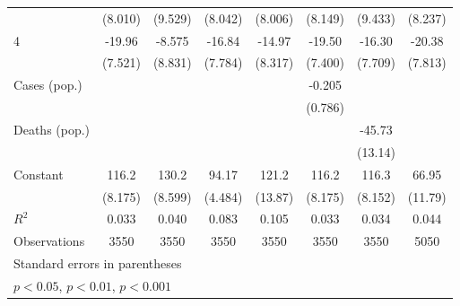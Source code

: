 \documentclass{article}
\begin{document}
{\begin{longtable}{l*{7}{c}}
                &  (8.010)         &  (9.529)         &  (8.042)         &  (8.006)         &  (8.149)         &  (9.433)         &  (8.237)         \\
4               &   -19.96\sym{*}  &   -8.575         &   -16.84\sym{*}  &   -14.97         &   -19.50\sym{*}  &   -16.30\sym{*}  &   -20.38\sym{*}  \\
                &  (7.521)         &  (8.831)         &  (7.784)         &  (8.317)         &  (7.400)         &  (7.709)         &  (7.813)         \\
Cases (pop.)    &                  &                  &                  &                  &   -0.205         &                  &                  \\
                &                  &                  &                  &                  &  (0.786)         &                  &                  \\
Deaths (pop.)   &                  &                  &                  &                  &                  &   -45.73\sym{**} &                  \\
                &                  &                  &                  &                  &                  &  (13.14)         &                  \\
Constant        &    116.2\sym{***}&    130.2\sym{***}&    94.17\sym{***}&    121.2\sym{***}&    116.2\sym{***}&    116.3\sym{***}&    66.95\sym{***}\\
                &  (8.175)         &  (8.599)         &  (4.484)         &  (13.87)         &  (8.175)         &  (8.152)         &  (11.79)         \\
\hline
\(R^{2}\)       &    0.033         &    0.040         &    0.083         &    0.105         &    0.033         &    0.034         &    0.044         \\
Observations    &     3550         &     3550         &     3550         &     3550         &     3550         &     3550         &     5050         \\
\hline\hline
\multicolumn{8}{l}{\footnotesize Standard errors in parentheses}\\
\multicolumn{8}{l}{\footnotesize \sym{*} \(p<0.05\), \sym{**} \(p<0.01\), \sym{***} \(p<0.001\)}\\
\end{longtable}
}
\end{document}
